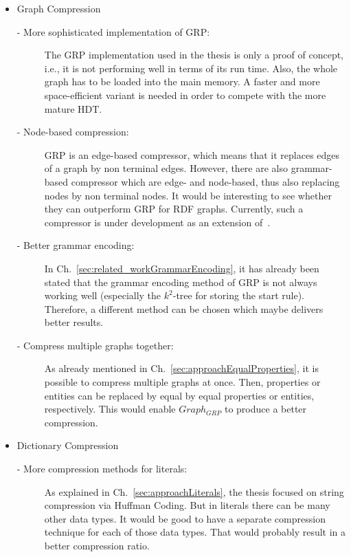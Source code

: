 \begin{itemize}
	\item Graph Compression
	\begin{description}
		\item [- More sophisticated implementation of GRP:] The GRP implementation used in the thesis is only a proof of concept, i.e., it is not performing well in terms of its run time. Also, the whole graph has to be loaded into the main memory. A faster and more space-efficient variant is needed in order to compete with the more mature HDT.
		\item [- Node-based compression:] GRP is an edge-based compressor, which means that it replaces edges of a graph by non terminal edges. However, there are also grammar-based compressor which are edge- and node-based, thus also replacing nodes by non terminal nodes. It would be interesting to see whether they can outperform GRP for RDF graphs. Currently, such a compressor is under development as an extension of~\cite{mattdk}.
		\item [- Better grammar encoding:] In Ch.~\ref{sec:related_workGrammarEncoding}, it has already been stated that the grammar encoding method of GRP is not always working well (especially the $k^2$-tree for storing the start rule). Therefore, a different method can be chosen which maybe delivers better results.
		\item [- Compress multiple graphs together:] As already mentioned in Ch.~\ref{sec:approachEqualProperties}, it is possible to compress multiple graphs at once. Then, properties or entities can be replaced by equal by equal properties or entities, respectively. This would enable $Graph_{GRP}$ to produce a better compression.
	\end{description}
	\item Dictionary Compression
	\begin{description}
		\item [- More compression methods for literals:] As explained in Ch.~\ref{sec:approachLiterals}, the thesis focused on string compression via Huffman Coding. But in literals there can be many other data types. It would be good to have a separate compression technique for each of those data types. That would probably result in a better compression ratio.
	\end{description}
\end{itemize}



